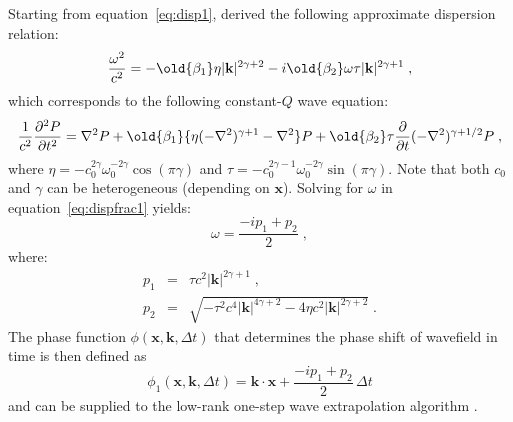 Starting from equation~\ref{eq:disp1}, \cite{zhu14a} derived the following approximate dispersion relation:
\begin{equation}
  \label{eq:dispfrac1}
  \frac{\omega^2}{c^2} = -\old{\beta_1 }\eta |\mathbf{k}|^{2\gamma +2} - i \old{\beta_2 }\omega\tau |\mathbf{k}|^{2\gamma +1} \;, 
\end{equation}
which corresponds to the following constant-$Q$ wave equation:
\begin{eqnarray}
  \label{eq:frac1}
 \frac{1}{c^2}\frac{\partial^2 P}{\partial t^2} = \nabla^2 P + \old{\beta_1} \{ \eta (-\nabla^2)^{\gamma+1} - \nabla^2 \} P
+ \old{\beta_2} \tau \frac{\partial}{\partial t}(-\nabla^2)^{\gamma+1/2} P \; ,
\end{eqnarray}
where $\eta = -c_0^{2\gamma}\omega_0^{-2\gamma}\cos(\pi \gamma)$ and $\tau = -c_0^{2\gamma-1}\omega_0^{-2\gamma}\sin(\pi \gamma)$.  Note that both $c_0$ and $\gamma$  can be heterogeneous (depending on $\mathbf{x}$). Solving for $\omega$ in equation~\ref{eq:dispfrac1} yields:
\begin{equation}
  \label{eq:omega}
  \omega = \frac{-ip_1 + p_2}{2} \; ,
\end{equation}
where:
\begin{eqnarray}
  \label{eq:p1}
  p_1 &=& \tau c^2|\mathbf{k}|^{2\gamma+1} \; , \\
  \label{eq:p2}
  p_2 &=& \sqrt{-\tau^2c^4|\mathbf{k}|^{4\gamma+2}-4\eta c^2|\mathbf{k}|^{2\gamma+2}} \;.
\end{eqnarray}
The phase function $\phi (\mathbf{x},\mathbf{k},\Delta t)$ that determines the phase shift of wavefield  in time is then defined as
\begin{equation}
  \label{eq:phasefunc}
  \phi_1 (\mathbf{x},\mathbf{k},\Delta t) = \mathbf{k} \cdot \mathbf{x} + \frac{-ip_1 + p_2}{2}\,\Delta t
\end{equation}
and can be supplied to the low-rank one-step wave extrapolation algorithm \cite[]{myself1}.

